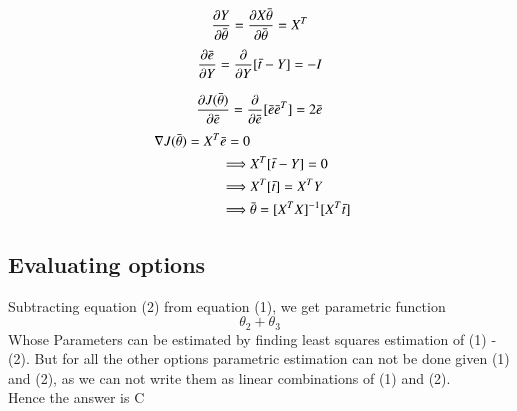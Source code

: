 \documentclass{article}
\begin{document}
\begin{equation*}
\frac{\partial  {Y}}{\partial \Bar{\theta} } = \frac{\partial  {X\Bar{\theta}}}{\partial \Bar{\theta} } =  {X^T}
\end{equation*}
\begin{equation*}
\frac{\partial \Bar{e}}{\partial  {Y} } = \frac{\partial {}}{\partial  {Y} }[\Bar{t} -  {Y}] = -I
\end{equation*}

\begin{equation*}
\frac{\partial J(\Bar{\theta})}{\partial \Bar{e}} = \frac{\partial}{\partial \Bar{e}} [\Bar{e} \Bar{e}^T] = 2\Bar{e}
\end{equation*}
\begin{align*}
 \nabla J(\Bar{\theta}) = X^T \Bar{e} = 0\\
 \implies & X^T [\Bar{t} -  {Y}] = 0\\
 \implies & X^T [\Bar{t}] =  X^T Y\\
 \implies & \Bar{\theta} = [X^TX]^{-1}[X^T\Bar{t}]
\end{align*}

\subsection{Evaluating options}
Subtracting equation (2) from equation (1), we get parametric function 
\begin{equation*}
     \theta_2 + \theta_3
\end{equation*}
Whose Parameters can be estimated by finding least squares estimation of (1) - (2). But for all the other options parametric estimation can not be done given (1) and (2), as we can not write them as linear combinations of (1) and (2).\\
Hence the answer is C
\end{document}

